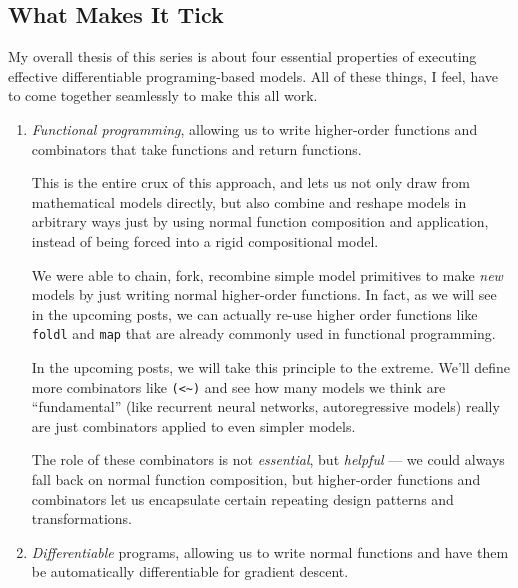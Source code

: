\documentclass[]{article}
\begin{document}
\hypertarget{what-makes-it-tick}{%
\subsection{What Makes It Tick}\label{what-makes-it-tick}}

My overall thesis of this series is about four essential properties of executing
effective differentiable programing-based models. All of these things, I feel,
have to come together seamlessly to make this all work.

\begin{enumerate}
\def\labelenumi{\arabic{enumi}.}
\item
  \emph{Functional programming}, allowing us to write higher-order functions and
  combinators that take functions and return functions.

  This is the entire crux of this approach, and lets us not only draw from
  mathematical models directly, but also combine and reshape models in arbitrary
  ways just by using normal function composition and application, instead of
  being forced into a rigid compositional model.

  We were able to chain, fork, recombine simple model primitives to make
  \emph{new} models by just writing normal higher-order functions. In fact, as
  we will see in the upcoming posts, we can actually re-use higher order
  functions like \texttt{foldl} and \texttt{map} that are already commonly used
  in functional programming.

  In the upcoming posts, we will take this principle to the extreme. We'll
  define more combinators like \texttt{(\textless{}\textasciitilde{})} and see
  how many models we think are ``fundamental'' (like recurrent neural networks,
  autoregressive models) really are just combinators applied to even simpler
  models.

  The role of these combinators is not \emph{essential}, but \emph{helpful} ---
  we could always fall back on normal function composition, but higher-order
  functions and combinators let us encapsulate certain repeating design patterns
  and transformations.
\item
  \emph{Differentiable} programs, allowing us to write normal functions and have
  them be automatically differentiable for gradient descent.


\end{enumerate}
\end{document}
